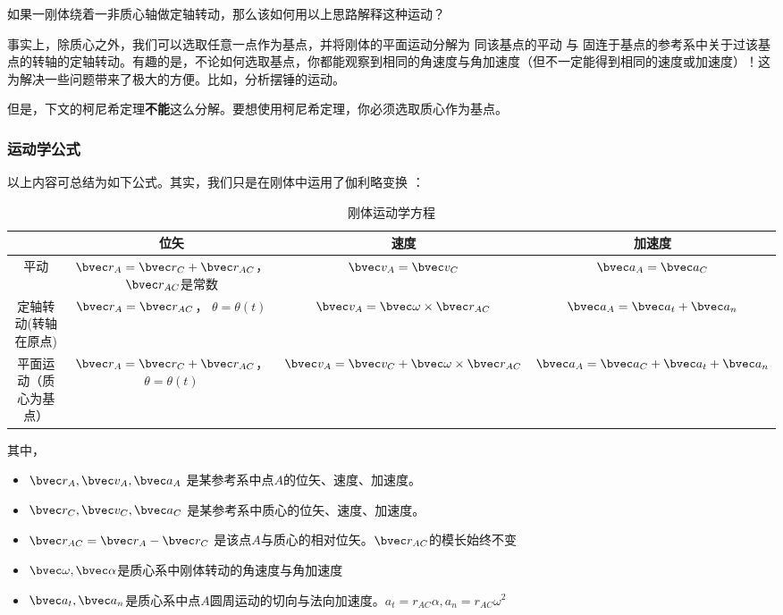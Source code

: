 \begin{exercise}{}
如果一刚体绕着一非质心轴做定轴转动，那么该如何用以上思路解释这种运动？
\end{exercise}

事实上，除质心之外，我们可以选取任意一点作为基点，并将刚体的平面运动分解为 同该基点的平动 与 固连于基点的参考系中关于过该基点的转轴的定轴转动。有趣的是，不论如何选取基点，你都能观察到相同的角速度与角加速度（但不一定能得到相同的速度或加速度）！这为解决一些问题带来了极大的方便。比如，分析摆锤的运动。

但是，下文的柯尼希定理\textbf{不能}这么分解。要想使用柯尼希定理，你必须选取质心作为基点。

\subsubsection{运动学公式}
以上内容可总结为如下公式。其实，我们只是在刚体中运用了伽利略变换 ：
\begin{table}[ht]
\centering
\caption{刚体运动学方程}\label{tab_RGAB_2}
\begin{tabular}{|c|c|c|c|}
\hline
 & 位矢 & 速度  & 加速度 \\
\hline
平动 & $\bvec r_A = \bvec r_C + \bvec r_{AC}$， $\bvec r_{AC}$是常数 & $\bvec v_A = \bvec v_C$ & $\bvec a_A = \bvec a_C$ \\
\hline
定轴转动(转轴在原点) & $\bvec r_A = \bvec r_{AC}$， $\theta =\theta (t)$ & $\bvec v_A = \bvec \omega \times \bvec r_{AC}$ & $\bvec a_A = \bvec a_t + \bvec a_n$\\
\hline
平面运动（质心为基点） & $\bvec r_A = \bvec r_C + \bvec r_{AC}$， $\theta =\theta (t)$& $\bvec v_A = \bvec v_C + \bvec \omega \times \bvec r_{AC}$ & $\bvec a_A = \bvec a_C + \bvec a_t + \bvec a_n$ \\
\hline
\end{tabular}
\end{table}
其中，
\begin{itemize}
\item $\bvec r_A, \bvec v_A, \bvec a_A$ 是某参考系中点$A$的位矢、速度、加速度。
\item $\bvec r_C, \bvec v_C, \bvec a_C$ 是某参考系中质心的位矢、速度、加速度。
\item $\bvec r_{AC} = \bvec r_A -\bvec r_C $ 是该点$A$与质心的相对位矢。$\bvec r_{AC}$的模长始终不变
\item $\bvec \omega, \bvec \alpha$是质心系中刚体转动的角速度与角加速度 
\item $\bvec a_t, \bvec a_n$是质心系中点$A$圆周运动的切向与法向加速度。$a_t=r_{AC}\alpha, a_n=r_{AC}\omega^2$
 
\end{itemize}

